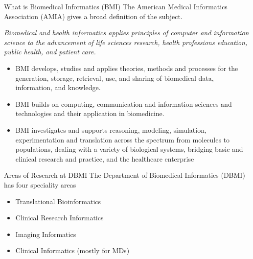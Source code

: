 \documentclass{beamer}
\begin{document}
	\begin{frame}{What is Biomedical Informatics (BMI)}		
		The American Medical Informatics Association (AMIA) gives a broad
		definition of the subject.
		
		{\it
			Biomedical and health informatics applies principles of computer and
			information science to the advancement of life sciences research, health
			professions education, public health, and patient care.}
		\begin{itemize}
			\item BMI develops, studies and applies theories, methods and processes for
			the generation, storage, retrieval, use, and sharing of biomedical data,
			information, and knowledge.
			\item BMI builds on computing, communication and information sciences
			and technologies and their application in biomedicine.
			\item BMI investigates and supports reasoning, modeling, simulation,
			experimentation and translation across the spectrum from molecules to
			populations, dealing with a variety of biological systems, bridging basic
			and clinical research and practice, and the healthcare enterprise
		\end{itemize}
	\end{frame}
	
	\begin{frame}{Areas of Research at DBMI}
		The Department of Biomedical Informatics (DBMI) has four speciality areas
		
		\begin{itemize}
			\item Translational Bioinformatics
			\item Clinical Research Informatics
			\item Imaging Informatics
			\item Clinical Informatics (mostly for MDs)
		\end{itemize}
		
	\end{frame}
	
\end{document}
